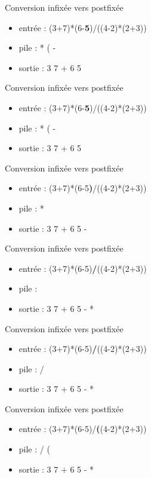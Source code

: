 \documentclass[12pt,a4paper]{beamer}
\begin{document}
\begin{frame}{Conversion infixée vers postfixée}
\begin{itemize}
\item entrée : (3+7)*(6-\textbf{5})/((4-2)*(2+3))
\item pile : * ( -
\item sortie : 3 7 + 6 5 
\end{itemize}
\end{frame}

\begin{frame}{Conversion infixée vers postfixée}
\begin{itemize}
\item entrée : (3+7)*(6-\textbf{5})/((4-2)*(2+3))
\item pile : * ( -
\item sortie : 3 7 + 6 5 
\end{itemize}
\end{frame}
\begin{frame}{Conversion infixée vers postfixée}
\begin{itemize}
\item entrée : (3+7)*(6-5\textbf{)}/((4-2)*(2+3))
\item pile : *
\item sortie : 3 7 + 6 5 -
\end{itemize}
\end{frame}

\begin{frame}{Conversion infixée vers postfixée}
\begin{itemize}
\item entrée : (3+7)*(6-5)\textbf{/}((4-2)*(2+3))
\item pile : 
\item sortie : 3 7 + 6 5 - *
\end{itemize}
\end{frame}

\begin{frame}{Conversion infixée vers postfixée}
\begin{itemize}
\item entrée : (3+7)*(6-5)\textbf{/}((4-2)*(2+3))
\item pile : /
\item sortie : 3 7 + 6 5 - *
\end{itemize}
\end{frame}

\begin{frame}{Conversion infixée vers postfixée}
\begin{itemize}
\item entrée : (3+7)*(6-5)/\textbf{(}(4-2)*(2+3))
\item pile : / (
\item sortie : 3 7 + 6 5 - *
\end{itemize}
\end{frame}
\end{document}
